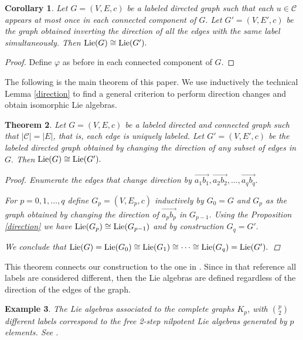 \documentclass[12pt]{amsart}
\newtheorem{teo}{Theorem}[section]
\newtheorem{cor}[teo]{Corollary}
\newtheorem{example}[teo]{Example}
\begin{document}
\begin{cor}
Let $G=(V,E,c)$ be a labeled directed graph such that each $u\in \mathcal{C}$ appears at most once in each connected component of $G.$ Let $G'=(V,E',c)$ be the graph obtained inverting the direction of all the edges with the same label simultaneously. Then ${\rm Lie}(G)\cong {\rm Lie}(G').$\qedhere
\end{cor}
\begin{proof}
Define $\varphi$ as before in each connected component of $G.$
\end{proof}

The following is the main theorem of this paper. We use inductively the technical Lemma \ref{direction} to find a general criterion to perform direction changes and obtain isomorphic Lie algebras.

\begin{teo}\label{th:main}
Let $G=(V,E,c)$ be a labeled directed and connected graph such that $|\mathcal{C}|=|E|$, that is, each edge is uniquely labeled. Let $G'=(V,E',c)$ be the labeled directed graph obtained by changing the direction of any subset of edges in $G.$ Then ${\rm Lie}(G)\cong {\rm Lie}(G').$
\begin{proof}
Enumerate the edges that change direction by $\overrightarrow{a_1b_1},\overrightarrow{a_2b_2},\hdots, \overrightarrow{a_qb_q}.$ 

For $p=0,1,\dotsc, q$ define $G_p=(V,E_p,c)$ inductively by $G_0=G$ and $G_p$ as the graph obtained by changing the direction of $\overrightarrow{a_pb_p}$ in $G_{p-1}.$ Using the Proposition \ref{direction} we have ${\rm Lie}(G_p)\cong {\rm Lie}(G_{p-1})$ and by construction $G_q=G'.$ 

We conclude that  ${\rm Lie}(G)={\rm Lie}(G_0)\cong {\rm Lie}(G_1)\cong \cdots \cong {\rm Lie}(G_q)={\rm Lie}(G').$
\end{proof}
\end{teo}	

This theorem connects our construction to the one in \cite{mainkar1}. Since in that reference all labels are considered different, then the Lie algebras are defined regardless of the direction of the edges of the graph.

\begin{example}
The Lie algebras associated to the complete graphs $K_p$, with ${p\choose 2}$ different labels correspond to the free 2-step nilpotent Lie algebras generated by $p$ elements. See \cite{reu}.
\end{example}
\end{document}
